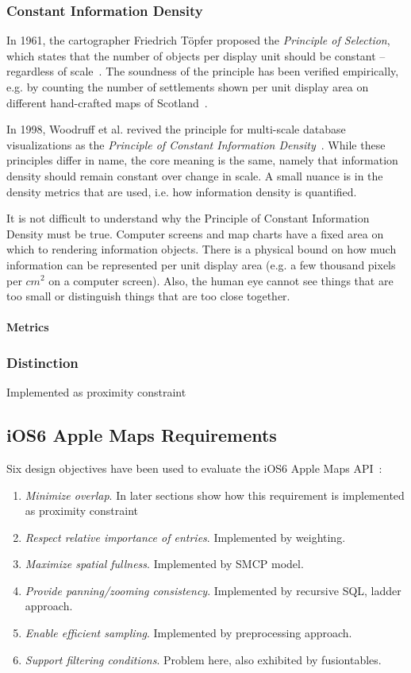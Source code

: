 \documentclass[11pt, oneside]{report}   	%
\begin{document}
\subsubsection{Constant Information Density}
In 1961, the cartographer Friedrich T\"{o}pfer proposed the \emph{Principle of Selection}, which states that the number of objects per display unit should be constant -- regardless of scale~\cite{topfer1966principles}. The soundness of the principle has been verified empirically, e.g. by counting the number of settlements shown per unit display area on different hand-crafted maps of Scotland~\cite{topfer1966principles}. 

In 1998, Woodruff et al. revived the principle for multi-scale database visualizations as the \emph{Principle of Constant Information Density}~\cite{woodruff1998constant}. While these principles differ in name, the core meaning is the same, namely that information density should remain constant over change in scale. A small nuance is in the density metrics that are used, i.e. how information density is quantified.

It is not difficult to understand why the Principle of Constant Information Density must be true. Computer screens and map charts have a fixed area on which to rendering information objects. There is a physical bound on how much information can be represented per unit display area (e.g. a few thousand pixels per $cm^2$ on a computer screen). Also, the human eye cannot see things that are too small or distinguish things that are too close together.

\paragraph{Metrics}

\subsubsection{Distinction}

Implemented as proximity constraint


\subsection{iOS6 Apple Maps Requirements}
Six design objectives have been used to evaluate the iOS6 Apple Maps API~\cite{nutanong2012multiresolution}:
\begin{enumerate}
\item \emph{Minimize overlap}. In later sections show how this requirement is implemented as proximity constraint
\item \emph{Respect relative importance of entries}. Implemented by weighting.
\item \emph{Maximize spatial fullness}. Implemented by SMCP model.
\item \emph{Provide panning/zooming consistency}. Implemented by recursive SQL, ladder approach.
\item \emph{Enable efficient sampling}. Implemented by preprocessing approach.
\item \emph{Support filtering conditions}. Problem here, also exhibited by fusiontables.
\end{enumerate}
\end{document}
